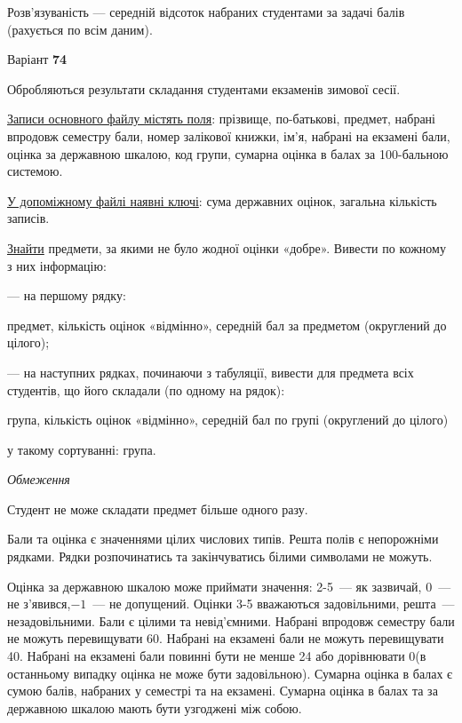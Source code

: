 \documentclass[11pt, ukrainian]{article}
\begin{document}
Розв'язуваність --- середній відсоток набраних студентами за задачі балів (рахується по всім даним).




\par
\newpage
{\center Варіант  \No \textbf { 74 }\par}
\bigskip
Обробляються результати складання студентами екзаменів зимової сесії.

\underline{Записи основного файлу містять поля}: прізвище, по-батькові, предмет, набрані впродовж семестру бали, номер залікової книжки, ім’я, набрані на екзамені бали, оцінка за державною шкалою, код групи, сумарна оцінка в балах за 100-бальною системою.

\underline{У допоміжному файлі наявні ключі}: сума державних оцінок, загальна кількість записів.

\underline{Знайти} предмети, за якими не було жодної оцінки «добре». Вивести по кожному з них інформацію:\par
{\noindent}--- на першому рядку:\par
предмет, кількість оцінок «відмінно», середній бал за предметом (округлений до цілого);

{\noindent}--- на наступних рядках, починаючи з табуляції, вивести для предмета всіх студентів, що його складали (по одному на рядок):\par
група, кількість оцінок «відмінно», середній бал по групі (округлений до цілого)

{\noindent}у такому сортуванні: група.


\bigskip\textit{Обмеження}

Студент не може складати предмет більше одного разу.

Бали та оцінка є значеннями цілих числових типів. Решта полів є непорожніми рядками.
Рядки розпочинатись та закінчуватись білими символами не можуть.

Оцінка за державною шкалою може приймати значення: 2-5~--- як зазвичай, 0~--- не з’явився,$-1$~--- не допущений. 
Оцінки 3-5 вважаються задовільними, решта~--- незадовільними. 
Бали є цілими та невід’ємними.
Набрані впродовж семестру бали не можуть перевищувати 60. 
Набрані на екзамені бали не можуть перевищувати 40. 
Набрані на екзамені бали повинні бути не менше 24 або дорівнювати 0(в останньому випадку оцінка не може бути задовільною). 
Сумарна оцінка в балах є сумою балів, набраних у семестрі та на екзамені.
Сумарна оцінка в балах та за державною шкалою мають бути узгоджені між собою.
\end{document}
